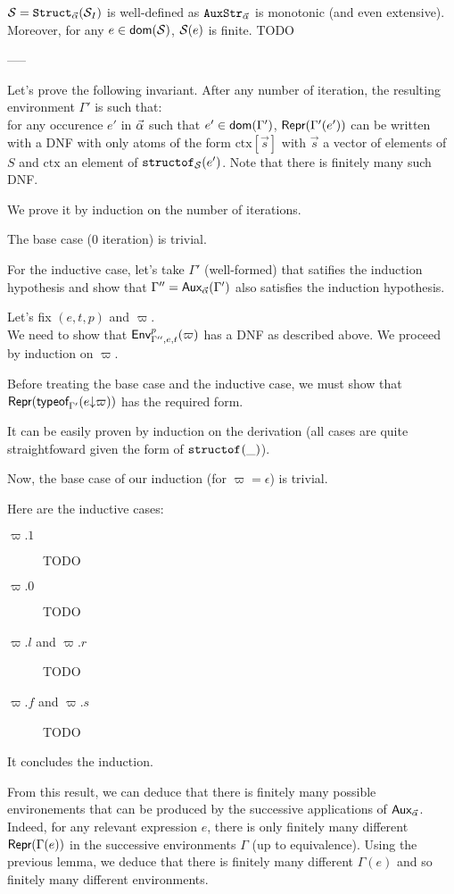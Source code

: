\documentclass[a4paper]{article}
\theoremstyle{definition}
\begin{document}
    $\mathcal{S} = \texttt{Struct}_{\vec \alpha}(\mathcal{S}_I)$ is well-defined as $\texttt{AuxStr}_{\vec \alpha}$ is monotonic (and even extensive).
    Moreover, for any $e\in\textsf{dom}(\mathcal{S})$, $\mathcal{S}(e)$ is finite. TODO

    -----

    Let's prove the following invariant. After any number of iteration, the resulting environment $\Gamma'$ is such that:\\
    for any occurence $e'$ in $\vec \alpha$ such that $e' \in \textsf{dom}(\Gamma')$, $\textsf{Repr}(\Gamma'(e'))$ can be written with a DNF with only atoms
    of the form $\text{ctx}[\vec s]$ with $\vec s$ a vector of elements of $S$ and $\text{ctx}$ an element of $\texttt{structof}_{\mathcal{S}}(e')$.
    Note that there is finitely many such DNF.
        
    We prove it by induction on the number of iterations.

    The base case (0 iteration) is trivial.

    For the inductive case, let's take $\Gamma'$ (well-formed) that satifies the induction hypothesis
    and show that $\Gamma'' = \textsf{Aux}_{\vec \alpha}(\Gamma')$ also satisfies the induction hypothesis.

    Let's fix $(e,t,p)$ and $\varpi$.\\
    We need to show that $\textsf{Env}^{p}_{\Gamma'',e,t} (\varpi)$ has a DNF as described above.    
    We proceed by induction on $\varpi$.

    Before treating the base case and the inductive case, we must show that $\textsf{Repr}(\textsf{typeof}_{\Gamma'}(e{\downarrow}\varpi))$
    has the required form.

    It can be easily proven by induction on the derivation (all cases are quite straightfoward given the form of $\texttt{structof}_{}(\_)$).

    Now, the base case of our induction (for $\varpi=\epsilon$) is trivial.

    Here are the inductive cases:
    \begin{description}
      \item[$\varpi.1$] TODO
      \item[$\varpi.0$] TODO
      \item[$\varpi.l$ and $\varpi.r$] TODO
      \item[$\varpi.f$ and $\varpi.s$] TODO
    \end{description}

    It concludes the induction.

    From this result, we can deduce that there is finitely many possible environements that can be produced by the successive applications of $\textsf{Aux}_{\vec \alpha}$.
    Indeed, for any relevant expression $e$, there is only finitely many different $\textsf{Repr}(\Gamma(e))$ in the successive environments $\Gamma$ (up to equivalence).
    Using the previous lemma, we deduce that there is finitely many different $\Gamma(e)$ and so finitely many different environments.
\end{document}
